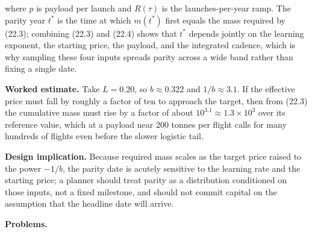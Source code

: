\documentclass[
  11pt,
  openany,
  oneside]{book}
\begin{document}
where \(p\) is payload per launch and \(R(\tau)\) is the
launches-per-year ramp. The parity year \(t^\ast\) is the time at which
\(m(t^\ast)\) first equals the mass required by (22.3); combining (22.3)
and (22.4) shows that \(t^\ast\) depends jointly on the learning
exponent, the starting price, the payload, and the integrated cadence,
which is why sampling these four inputs spreads parity across a wide
band rather than fixing a single date.

\textbf{Worked estimate.} Take \(L = 0.20\), so \(b \approx 0.322\) and
\(1/b \approx 3.1\). If the effective price must fall by roughly a
factor of ten to approach the target, then from (22.3) the cumulative
mass must rise by a factor of about \(10^{3.1} \approx 1.3 \times 10^3\)
over its reference value, which at a payload near 200 tonnes per flight
calls for many hundreds of flights even before the slower logistic tail.

\textbf{Design implication.} Because required mass scales as the target
price raised to the power \(-1/b\), the parity date is acutely sensitive
to the learning rate and the starting price; a planner should treat
parity as a distribution conditioned on those inputs, not a fixed
milestone, and should not commit capital on the assumption that the
headline date will arrive.

\textbf{Problems.}
\end{document}
